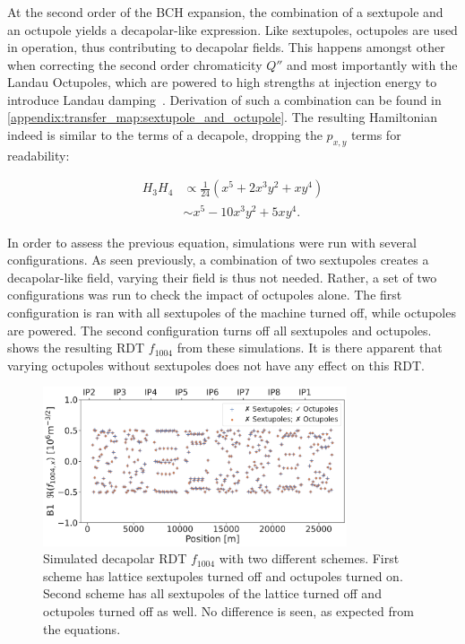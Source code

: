 \subsubsection{}


At the second order of the BCH expansion, the combination of a sextupole and an octupole yields a
decapolar-like expression.
Like sextupoles, octupoles are used in operation, thus contributing to decapolar fields. This
happens amongst other when correcting the second order chromaticity $Q''$ and most importantly with
the Landau Octupoles, which are powered to high strengths at injection energy to introduce Landau
damping~\cite{gareyte_landau_1997}.
Derivation of such a combination can be found in
\cref{appendix:transfer_map:sextupole_and_octupole}. The resulting Hamiltonian indeed is similar to
the terms of a decapole, dropping the $p_{x,y}$ terms for readability:

\begin{equation}
    \begin{aligned}
         H_3 H_4 &\propto \frac{1}{24} \left(x^5 + 2x^3y^2 + xy^4 \right)\\
                   &\sim    x^5 - 10x^3y^2 + 5xy^4.
    \end{aligned}
    \label{eq:decapoles:sextupole_octupole_b5}
\end{equation}

In order to assess the previous equation, simulations were run with several configurations.
As seen previously, a combination of two sextupoles creates a decapolar-like field, varying their 
field is thus not needed. Rather, a set of two configurations was run to check the impact of 
octupoles alone. The first configuration is ran with all sextupoles of the machine
turned off, while octupoles are powered. The second configuration turns off all sextupoles and
octupoles.  shows the resulting RDT $f_{1004}$
from these simulations. It is there apparent that varying octupoles without sextupoles does not have 
any effect on this RDT.

\begin{figure}[!htb]
    \centering
    \includegraphics[width=0.8\textwidth]{./images/f1004/f1004_no_ms.pdf}
    \caption{Simulated decapolar RDT $f_{1004}$ with two different schemes. First scheme has
    lattice sextupoles turned off and octupoles turned on. Second scheme has all sextupoles of the
    lattice turned off and octupoles turned off as well. No difference is seen, as expected from
    the equations.}
    \label{fig:decapoles:rdts:sectupole_octupole_no_diff}
\end{figure}

